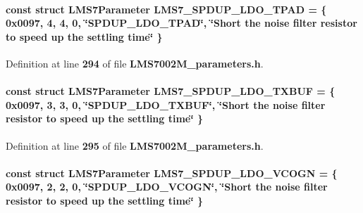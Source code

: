\paragraph[{L\+M\+S7\+\_\+\+S\+P\+D\+U\+P\+\_\+\+L\+D\+O\+\_\+\+T\+P\+AD}]{\setlength{\rightskip}{0pt plus 5cm}const struct {\bf L\+M\+S7\+Parameter} L\+M\+S7\+\_\+\+S\+P\+D\+U\+P\+\_\+\+L\+D\+O\+\_\+\+T\+P\+AD = \{ 0x0097, 4, 4, 0, \char`\"{}\+S\+P\+D\+U\+P\+\_\+\+L\+D\+O\+\_\+\+T\+P\+A\+D\char`\"{}, \char`\"{}\+Short the noise filter resistor to speed up the settling time\char`\"{} \}\hspace{0.3cm}{\ttfamily [static]}}\label{LMS7002M__parameters_8h_a4419912a18419695fd2b99c784800467}


Definition at line {\bf 294} of file {\bf L\+M\+S7002\+M\+\_\+parameters.\+h}.

\paragraph[{L\+M\+S7\+\_\+\+S\+P\+D\+U\+P\+\_\+\+L\+D\+O\+\_\+\+T\+X\+B\+UF}]{\setlength{\rightskip}{0pt plus 5cm}const struct {\bf L\+M\+S7\+Parameter} L\+M\+S7\+\_\+\+S\+P\+D\+U\+P\+\_\+\+L\+D\+O\+\_\+\+T\+X\+B\+UF = \{ 0x0097, 3, 3, 0, \char`\"{}\+S\+P\+D\+U\+P\+\_\+\+L\+D\+O\+\_\+\+T\+X\+B\+U\+F\char`\"{}, \char`\"{}\+Short the noise filter resistor to speed up the settling time\char`\"{} \}\hspace{0.3cm}{\ttfamily [static]}}\label{LMS7002M__parameters_8h_aeb700ab564d1df785e97ea5005b9a70d}


Definition at line {\bf 295} of file {\bf L\+M\+S7002\+M\+\_\+parameters.\+h}.

\paragraph[{L\+M\+S7\+\_\+\+S\+P\+D\+U\+P\+\_\+\+L\+D\+O\+\_\+\+V\+C\+O\+GN}]{\setlength{\rightskip}{0pt plus 5cm}const struct {\bf L\+M\+S7\+Parameter} L\+M\+S7\+\_\+\+S\+P\+D\+U\+P\+\_\+\+L\+D\+O\+\_\+\+V\+C\+O\+GN = \{ 0x0097, 2, 2, 0, \char`\"{}\+S\+P\+D\+U\+P\+\_\+\+L\+D\+O\+\_\+\+V\+C\+O\+G\+N\char`\"{}, \char`\"{}\+Short the noise filter resistor to speed up the settling time\char`\"{} \}\hspace{0.3cm}{\ttfamily [static]}}\label{LMS7002M__parameters_8h_a41b672d643e02b6a8032d41c6e164d5f}


